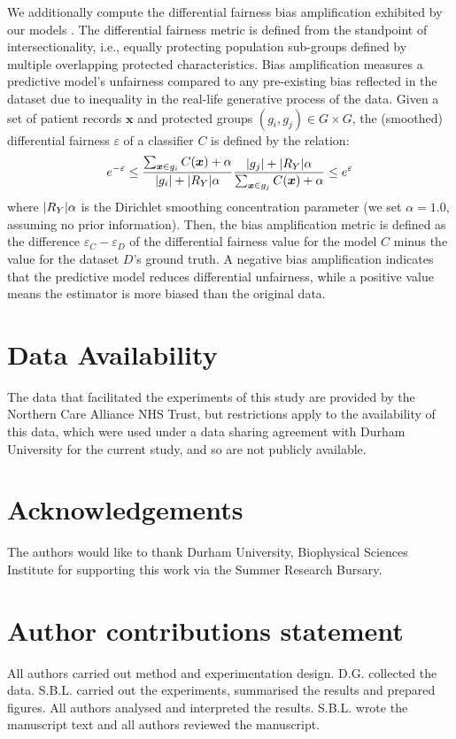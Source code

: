 \documentclass[fleqn,10pt]{wlscirep}
\DeclarePairedDelimiter\abs{\lvert}{\rvert}%
\begin{document}
We additionally compute the differential fairness bias amplification exhibited by our models \cite{Foulds20}. The differential fairness metric is defined from the standpoint of intersectionality, i.e., equally protecting population sub-groups defined by multiple overlapping protected characteristics. Bias amplification measures a predictive model's unfairness compared to any pre-existing bias reflected in the dataset due to inequality in the real-life generative process of the data. Given a set of patient records $\bm{x}$ and protected groups $(g_i, g_j) \in G \times G$, the (smoothed) differential fairness $\varepsilon$ of a classifier $C$ is defined by the relation:
\begin{equation*}
    e^{-\varepsilon} \leq \frac{\sum_{\bm{x} \in g_i} C(\bm{x}) + \alpha}{\abs{g_i} + \abs{R_Y}\alpha} \frac{\abs{g_j} + \abs{R_Y}\alpha}{\sum_{\bm{x} \in g_j} C(\bm{x}) + \alpha} \leq e^{\varepsilon}
\end{equation*}
where $\abs{R_Y} \alpha$ is the Dirichlet smoothing concentration parameter (we set $\alpha = 1.0$, assuming no prior information). Then, the bias amplification metric is defined as the difference $\varepsilon_{C} - \varepsilon_{D}$ of the differential fairness value for the model $C$ minus the value for the dataset $D$'s ground truth.  A negative bias amplification indicates that the predictive model reduces differential unfairness, while a positive value means the estimator is more biased than the original data.


\section*{Data Availability}
The data that facilitated the experiments of this study are provided by the Northern Care Alliance NHS Trust, but restrictions apply to the availability of this data, which were used under a data sharing agreement with Durham University for the current study, and so are not publicly available.

\section*{Acknowledgements}
The authors would like to thank Durham University, Biophysical Sciences Institute for supporting this work via the Summer Research Bursary.

\section*{Author contributions statement}
All authors carried out method and experimentation design. D.G. collected the data. S.B.L. carried out the experiments, summarised the results and prepared figures. All authors analysed and interpreted the results. S.B.L. wrote the manuscript text and all authors reviewed the manuscript.


\end{document}
